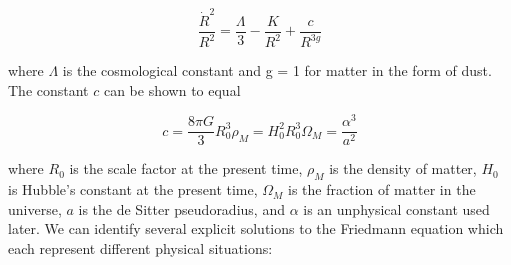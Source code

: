 \documentclass[preprint,notitlepage,amsmath,amssymb,floatfix]{revtex4-1}
\begin{document}
\begin{equation}
\frac{\dot{R}^2}{R^2} = \frac{\Lambda}{3} - \frac{K}{R^2} + \frac{c}{R^{3g}}
\end{equation}

\noindent where $\Lambda$ is the cosmological constant and g = 1 for matter in the form of dust.  The constant $c$ can be shown to equal

\begin{equation}
c = \frac{8\pi G}{3}R_0^3\rho_M = H_0^2R_0^3\Omega_M = \frac{\alpha^3}{a^2}
\end{equation}

\noindent where $R_0$ is the scale factor at the present time, $\rho_M$ is the density of matter, $H_0$ is Hubble's constant at the present time, $\Omega_M$ is the fraction of matter in the universe, $a$ is the de Sitter pseudoradius, and $\alpha$ is an unphysical constant used later.  We can identify several explicit solutions to the Friedmann equation which each represent different physical situations:
\end{document}
